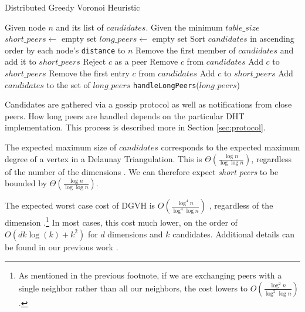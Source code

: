 \documentclass[11pt,conference]{IEEEtran}
\begin{document}
\begin{algorithm} %
	\caption{Distributed Greedy Voronoi Heuristic}
	\label{alg:dgvh}
	\small
	\begin{algorithmic}[1]  %
		\State Given node $n$ and its list of $candidates$.
		\State Given the minimum $table\_size$
		\State $short\_peers \leftarrow$ empty set%
		\State $long\_peers \leftarrow$ empty set %
		\State Sort $candidates$ in ascending order by each node's \texttt{distance} to $n$
		\State Remove the first member of $candidates$ and add it to $short\_peers$
				\State Reject $c$ as a peer
			\Else
				\State Remove $c$ from $candidates$
				\State Add $c$ to $short\_peers$
			\EndIf
		\EndFor
			\State Remove the first entry $c$ from $candidates$
			\State Add $c$ to $short\_peers$
		\EndWhile
		\State Add $candidates$ to the set of $long\_peers$	
		\State \texttt{handleLongPeers}($long\_peers$)
	\end{algorithmic}
\end{algorithm} 


Candidates are gathered via a gossip protocol as well as notifications from close peers.
How long peers are handled depends on the particular DHT implementation.
This process is described more in Section \ref{sec:protocol}.

The expected maximum size of $ candidates $ corresponds to the expected maximum degree of a vertex in a Delaunay Triangulation.
This is  $\Theta(\frac{\log n}{\log \log n} )$, regardless of the number of the dimensions \cite{bern1991expected}. 
We can therefore expect \textit{short peers} to be bounded by $\Theta(\frac{\log n}{\log \log n})$.

The expected worst case cost of DGVH is \(O(\frac{\log^{4} n}{\log^{4} \log n} )\) \cite{dgvh}, regardless of the dimension \cite{dgvh}.\footnote{As mentioned in the previous footnote, if we are exchanging peers with a single neighbor rather than all our neighbors, the cost lowers to \(O(\frac{\log^{2} n}{\log^{2} \log n} )\).}
In most cases, this cost much lower, on the order of $ O(dk\log(k) + k^{2} ) $ for $ d $ dimensions and $ k $ candidates.
Additional details can be found in our previous work \cite{dgvh}.
\end{document}
